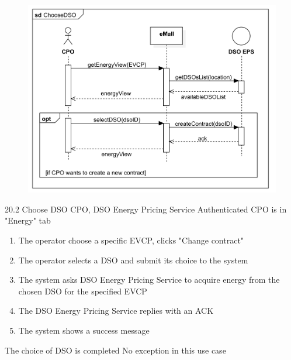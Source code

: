 \usecase
{
    \begin{figure}[H]
        \centering
        \includegraphics[scale=0.9]{src/sequence_diagram/retrievePrices&chooseDSO.png}
    \end{figure}
}
{20.2}
{Choose DSO} %
{CPO, DSO Energy Pricing Service} %
{Authenticated CPO is in "Energy" tab} %
{ %
    \begin{enumerate}
        \item The operator choose a specific EVCP, clicks "Change contract"
        \item The operator selects a DSO and submit its choice to the system
        \item The system asks DSO Energy Pricing Service to acquire energy from the chosen DSO for the specified EVCP
        \item The DSO Energy Pricing Service replies with an ACK
        \item The system shows a success message
    \end{enumerate}
}
{The choice of DSO is completed} %
{ %
    No exception in this use case
}
{ %
}

\pagebreak

